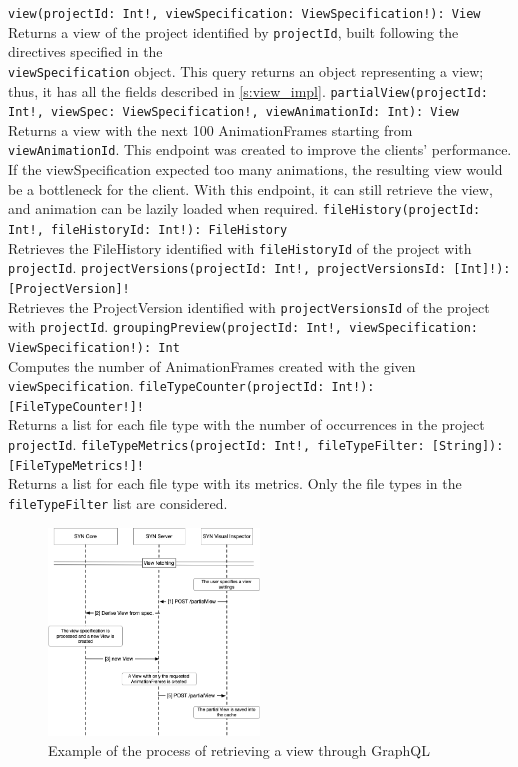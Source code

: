 \bigbreak
\noindent
\verb|view(projectId: Int!, viewSpecification: ViewSpecification!): View| \\
\indent
Returns a view of the project identified by \texttt{projectId}, built following the directives specified in the \\ \texttt{viewSpecification} object. 
This query returns an object representing a view; thus, it has all the fields described in \autoref{s:view_impl}. 
\bigbreak
\noindent
\verb|partialView(projectId: Int!, viewSpec: ViewSpecification!, viewAnimationId: Int): View| \\
\indent
Returns a view with the next 100 AnimationFrames starting from \texttt{viewAnimationId}. 
This endpoint was created to improve the clients' performance. If the viewSpecification expected too many animations, the resulting view would be a bottleneck for the client.
With this endpoint, it can still retrieve the view, and animation can be lazily loaded when required. 
\bigbreak
\noindent
\verb|fileHistory(projectId: Int!, fileHistoryId: Int!): FileHistory| \\
\indent
Retrieves the FileHistory identified with \texttt{fileHistoryId} of the project with \texttt{projectId}.
\bigbreak
\noindent
\verb|projectVersions(projectId: Int!, projectVersionsId: [Int]!): [ProjectVersion]!| \\
\indent
Retrieves the ProjectVersion identified with \texttt{projectVersionsId} of the project with \texttt{projectId}.
\bigbreak
\noindent
\verb|groupingPreview(projectId: Int!, viewSpecification: ViewSpecification!): Int| \\
\indent
Computes the number of AnimationFrames created with the given \texttt{viewSpecification}.
\bigbreak
\noindent
\verb|fileTypeCounter(projectId: Int!): [FileTypeCounter!]!| \\
\indent
Returns a list for each file type with the number of occurrences in the project \texttt{projectId}.
\bigbreak
\noindent
\verb|fileTypeMetrics(projectId: Int!, fileTypeFilter: [String]): [FileTypeMetrics!]!| \\
\indent
Returns a list for each file type with its metrics. Only the file types in the \texttt{fileTypeFilter} list are considered. 

\clearpage
\begin{figure}
    \center
    \includegraphics[width=0.5\textwidth]{ServertClientFlow.jpg}
    \caption{Example of the process of retrieving a view through GraphQL}
    \label{fig:ServertClientFlow}
\end{figure}


